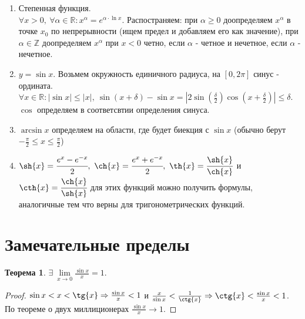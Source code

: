 \documentclass[a4paper, 12pt]{article}
\newcommand{\Z}{\mathbb{Z}}
\newcommand{\R}{\mathbb{R}}
\theoremstyle{definition}
\newtheorem*{theorem}{Теорема}
\begin{document}
\begin{enumerate}
            \item Степенная функция.\\
            $\forall x>0,\ \forall \alpha\in\R: x^{\alpha}=e^{\alpha\cdot \ln{x}}$. Распостраняем: при $\alpha \geq 0$ доопределяем $x^{\alpha}$ в точке $x_0$ по непрерывности (ищем предел и добавляем его как значение), при $\alpha\in \Z$ доопределяем $x^{\alpha}$ при $x<0$ четно, если $\alpha$ - четное и нечетное, если $\alpha$ - нечетное.
            \item $y=\sin{x}$. Возьмем окружность единичного радиуса, на $[0,2\pi]$ синус - ордината. $\forall x\in\R: |\sin{x}|\leq |x|,\ \sin{(x+\delta)}-\sin{x}=|2\sin{(\frac{\delta}{2})}\cos{(x+\frac{\delta}{2})}|\leq \delta$. $\cos$ определяем в соответсвтии определения синуса.
            \item $\arcsin{x}$ определяем на области, где будет биекция с $\sin{x}$ (обычно берут $-\frac{\pi}{2}\leq x\leq \frac{\pi}{2}$)
            \item $\sh{x}=\cfrac{e^x-e^{-x}}{2},\ \ch{x}=\cfrac{e^x+e^{-x}}{2},\ \th{x}=\cfrac{\sh{x}}{\ch{x}}$ и $\cth{x}=\cfrac{\ch{x}}{\sh{x}}$ для этих функций можно получить формулы, аналогичные тем что верны для тригонометрических функций.
        \end{enumerate}
        \section{Замечательные пределы}
        \begin{theorem}
            $\exists\ \lim\limits_{x\to 0} \frac{\sin{x}}{x}=1$.
        \end{theorem}     
        \begin{proof}
            $\sin{x}<x<\tg{x}\Rightarrow \frac{\sin{x}}{x}<1$ и $\frac{x}{\sin{x}}<\frac{1}{\ctg{x}}\\
            \Rightarrow \ctg{x}<\frac{\sin{x}}{x}<1$. По теореме о двух миллиционерах $\frac{\sin{x}}{x}\to 1$.
        \end{proof} 
\end{document}
